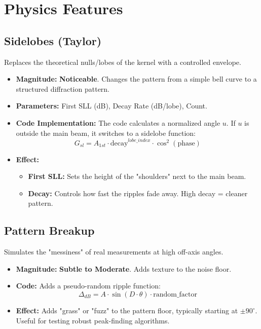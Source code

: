 \documentclass[11pt,a4paper]{article}
\begin{document}
\newpage
\section{Physics Features}

\subsection{Sidelobes (Taylor)}
Replaces the theoretical nulls/lobes of the kernel with a controlled envelope.
\begin{itemize}
    \item \textbf{Magnitude:} \textbf{Noticeable}. Changes the pattern from a simple bell curve to a structured diffraction pattern.
    \item \textbf{Parameters:} First SLL (dB), Decay Rate (dB/lobe), Count.
    \item \textbf{Code Implementation:} The code calculates a normalized angle $u$. If $u$ is outside the main beam, it switches to a sidelobe function:
    \[ G_{sl} = A_{1st} \cdot \text{decay}^{lobe\_index} \cdot \cos^2(\text{phase}) \]
    \item \textbf{Effect:}
    \begin{itemize}
        \item \textbf{First SLL:} Sets the height of the "shoulders" next to the main beam.
        \item \textbf{Decay:} Controls how fast the ripples fade away. High decay = cleaner pattern.
    \end{itemize}
\end{itemize}

\subsection{Pattern Breakup}
Simulates the "messiness" of real measurements at high off-axis angles.
\begin{itemize}
    \item \textbf{Magnitude:} \textbf{Subtle to Moderate}. Adds texture to the noise floor.
    \item \textbf{Code:} Adds a pseudo-random ripple function:
    \[ \Delta_{dB} = A \cdot \sin(D \cdot \theta) \cdot \text{random\_factor} \]
    \item \textbf{Effect:} Adds "grass" or "fuzz" to the pattern floor, typically starting at $\pm 90^\circ$. Useful for testing robust peak-finding algorithms.
\end{itemize}
\end{document}
